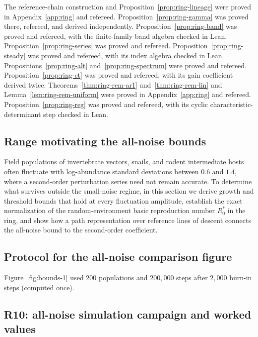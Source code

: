 The reference-chain construction and Proposition~\ref{prop:ring-lineage} were proved in Appendix~\ref{app:ring} and refereed. Proposition~\ref{prop:ring-gamma} was proved there, refereed, and derived independently. Proposition~\ref{prop:ring-band} was proved and refereed, with the finite-family band algebra checked in Lean. Proposition~\ref{prop:ring-series} was proved and refereed. Proposition~\ref{prop:ring-steady} was proved and refereed, with its index algebra checked in Lean. Propositions~\ref{prop:ring-alt} and~\ref{prop:ring-spectrum} were proved and refereed. Proposition~\ref{prop:ring-ct} was proved and refereed, with its gain coefficient derived twice. Theorems~\ref{thm:ring-rem-ar1} and~\ref{thm:ring-rem-lin} and Lemma~\ref{lem:ring-rem-uniform} were proved in Appendix~\ref{app:ring} and refereed. Proposition~\ref{prop:ring-reg} was proved and refereed, with its cyclic characteristic-determinant step checked in Lean.

\subsection{Range motivating the all-noise bounds}\label{esm:bounds-range}

Field populations of invertebrate vectors, snails, and rodent intermediate hosts often fluctuate with log-abundance standard deviations between $0.6$ and $1.4$, where a second-order perturbation series need not remain accurate. To determine what survives outside the small-noise regime, in this section we derive growth and threshold bounds that hold at every fluctuation amplitude, establish the exact normalization of the random-environment basic reproduction number $R_0^*$ in the ring, and show how a path representation over reference lines of descent connects the all-noise bound to the second-order coefficient.

\subsection{Protocol for the all-noise comparison figure}\label{esm:bounds-figure-protocol}

Figure~\ref{fig:bounds-1} used 200 populations and $200{,}000$ steps after $2{,}000$ burn-in steps (computed once).

\subsection{R10: all-noise simulation campaign and worked values}\label{esm:bounds-runs}

